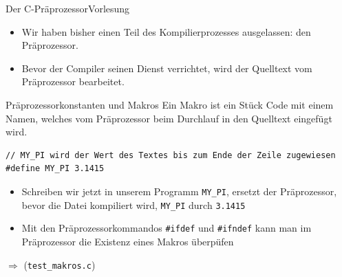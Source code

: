 \documentclass[xcolor=dvipsnames]{beamer}
\newcounter{lecturecounter}
\begin{document}
\begin{frame}[fragile]{Der C-Präprozessor}{Vorlesung }
\begin{block}{}
  \begin{itemize}
    \item{Wir haben bisher einen Teil des Kompilierprozesses ausgelassen: den Präprozessor.}
    \item{Bevor der Compiler seinen Dienst verrichtet, wird der Quelltext vom Präprozessor bearbeitet.}
  \end{itemize}
\end{block}
\begin{block}{Präprozessorkonstanten und Makros}
  Ein Makro ist ein Stück Code mit einem Namen, welches vom Präprozessor beim Durchlauf in den Quelltext eingefügt wird.
\end{block}
\begin{lstlisting}
// MY_PI wird der Wert des Textes bis zum Ende der Zeile zugewiesen
#define MY_PI 3.1415
\end{lstlisting}
\begin{itemize}
  \item{Schreiben wir jetzt in unserem Programm \verb|MY_PI|, ersetzt der Präprozessor, bevor die Datei kompiliert wird, \verb|MY_PI| durch \texttt{3.1415}}
  \item{Mit den Präprozessorkommandos \verb|#ifdef| und \verb|#ifndef| kann man im Präprozessor die Existenz eines Makros überpüfen}
\end{itemize}
$\Rightarrow$ (\verb|test_makros.c|)
\end{frame}
\end{document}

